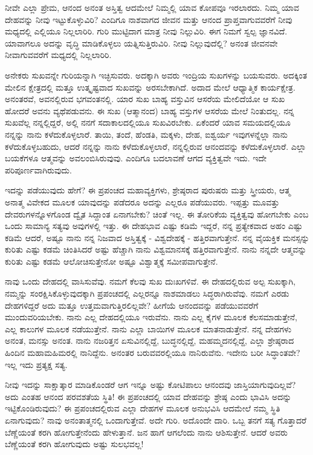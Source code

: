 ನೀವೇ ಎಲ್ಲಾ ಪ್ರೇಮ, ಆನಂದ ಅನಂತ ಅಸ್ತಿತ್ವ ಆದಮೇಲೆ ನಿಮ್ಮಲ್ಲಿ ಯಾವ ಕೋಪವೂ ಇರಲಾರದು. ನಿಮ್ಮ ಯಾವ ದೇಹವನ್ನು ನೀವು ಇಟ್ಟುಕೊಳ್ಳುವಿರಿ? ಎಂದಿಗೂ ನಾಶವಾಗದ ಜೀವನ ಮತ್ತು ಆನಂದ ಪ್ರಾಪ್ತವಾಗುವವರೆಗೆ ನೀವು ಮಧ್ಯದಲ್ಲಿ ಎಲ್ಲಿಯೂ ನಿಲ್ಲಲಾರಿರಿ. ಗುರಿ ಮುಟ್ಟಿದಾಗ ಮಾತ್ರ ನೀವು ನಿಲ್ಲುವಿರಿ. ಈಗ ನಿಮಗೆ ಸ್ವಲ್ಪ ಜ್ಞಾನವಿದೆ. ಯಾವಾಗಲೂ ಅದನ್ನು ವೃದ್ಧಿ ಮಾಡಿಕೊಳ್ಳಲು ಯತ್ನಿಸುತ್ತಿರುವಿರಿ. ನೀವು ನಿಲ್ಲುವುದೆಲ್ಲಿ? ಅನಂತ ಜೀವನವೇ ನೀವಾಗುವವರೆಗೆ ಮಧ್ಯದಲ್ಲಿ ನಿಲ್ಲಲಾರಿರಿ.

ಅನೇಕರು ಸುಖವನ್ನೇ ಗುರಿಯನ್ನಾಗಿ ಇಚ್ಛಿಸುವರು. ಅದಕ್ಕಾಗಿ ಅವರು ಇಂದ್ರಿಯ ಸುಖಗಳನ್ನು ಬಯಸುವರು. ಅದಕ್ಕಿಂತ ಮೇಲಿನ ಕ್ಷೇತ್ರದಲ್ಲಿ ಮತ್ತೂ ಉತ್ಕೃಷ್ಟವಾದ ಸುಖವನ್ನು ಅರಸಬೇಕಾಗಿದೆ. ಅದಾದ ಮೇಲೆ ಆಧ್ಯಾತ್ಮಿಕ ಕಾರ್ಯಕ್ಷೇತ್ರ. ಅನಂತರವೆ, ಅವನಲ್ಲಿರುವ ಭಗವಂತನಲ್ಲಿ. ಯಾರ ಸುಖ ಬಾಹ್ಯ ವಸ್ತುವಿನ ಆಸರೆಯ ಮೇಲಿದೆಯೋ ಆ ಸುಖ ಹೋದರೆ ಅವನು ವ್ಯಥೆಪಡುವನು. ಈ ಸುಖ (ಆತ್ಮಾನಂದ) ಬಾಹ್ಯ ವಸ್ತುಗಳ ಆಸರೆಯ ಮೇಲೆ ನಿಂತುದಲ್ಲ. ನನ್ನ ಸುಖವೆಲ್ಲ ನನ್ನಲ್ಲಿದ್ದರೆ, ಅಲ್ಲಿ ನನಗೆ ಸದಾಕಾಲದಲ್ಲಿಯೂ ಸುಖವಿರಬೇಕು. ಏಕೆಂದರೆ ಯಾವ ಸಮಯದಲ್ಲಿಯೂ ನನ್ನನ್ನು ನಾನು ಕಳೆದುಕೊಳ್ಳಲಾರೆ. ತಾಯಿ, ತಂದೆ, ಹೆಂಡತಿ, ಮಕ್ಕಳು, ದೇಹ, ಐಶ್ವರ್ಯ ಇವುಗಳನ್ನೆಲ್ಲಾ ನಾನು ಕಳೆದುಕೊಳ್ಳಬಹುದು, ಆದರೆ ನನ್ನನ್ನು ನಾನು ಕಳೆದುಕೊಳ್ಳಲಾರೆ, ನನ್ನಲ್ಲಿರುವ ಆನಂದವನ್ನು ಕಳೆದುಕೊಳ್ಳಲಾರೆ. ಎಲ್ಲಾ ಬಯಕೆಗಳೂ ಆತ್ಮವನ್ನು ಅವಲಂಬಿಸಿರುವುವು. ಎಂದಿಗೂ ಬದಲಾವಣೆ ಆಗದ ವ್ಯಕ್ತಿತ್ವವೇ ಇದು. ಇದೇ ಪರಿಪೂರ್ಣವಾಗಿರುವುದು.

ಇದನ್ನು ಪಡೆಯುವುದು ಹೇಗೆ? ಈ ಪ್ರಪಂಚದ ಮಹಾವ್ಯಕ್ತಿಗಳು, ಶ್ರೇಷ್ಠರಾದ ಪುರುಷರು ಮತ್ತು ಸ್ತ್ರೀಯರು, ಆತ್ಮ ಅನಾತ್ಮ ವಿವೇಕದ ಮೂಲಕ ಯಾವುದನ್ನು ಪಡೆದರೂ ಅದನ್ನು ಎಲ್ಲರೂ ಪಡೆಯುವರು. ಇಪ್ಪತ್ತು ಮೂವತ್ತು ದೇವರುಗಳನ್ನೊಳಗೊಂಡ ದ್ವೈತ ಸಿದ್ದಾಂತ ಏನಾಗಬೇಕು? ಚಿಂತೆ ಇಲ್ಲ. ಈ ತೋರಿಕೆಯ ವ್ಯಕ್ತಿತ್ವವು ಹೋಗಬೇಕು ಎಂಬ ಒಂದು ಸಾಮಾನ್ಯ ಸತ್ಯವು ಅವುಗಳಲ್ಲಿ ಇತ್ತು. ಈ ದೇಹಭಾವ ಎಷ್ಟು ಕಡಿಮೆ ಇದ್ದರೆ, ನನ್ನ ಪ್ರತ್ಯೇಕವಾದ ಅಹಂ ಎಷ್ಟು ಕಡಿಮೆ ಆದರೆ, ಅಷ್ಟೂ ನಾನು ನನ್ನ ನಿಜವಾದ ಅಸ್ತಿತ್ವಕ್ಕೆ - ವಿಶ್ವದೇಹಕ್ಕೆ - ಹತ್ತಿರವಾಗುತ್ತೇನೆ. ನನ್ನ ವೈಯಕ್ತಿಕ ಮನಸ್ಸನ್ನು ಕುರಿತು ಎಷ್ಟು ಕಡಮೆ ಚಿಂತಿಸಿದರೆ ಅಷ್ಟು ಹೆಚ್ಚಾಗಿ ನಾನು ವಿಶ್ವಮಾನಸಕ್ಕೆ ಹತ್ತಿರವಾಗುತ್ತೇನೆ. ನಾನು ನನ್ನದೇ ಆತ್ಮವನ್ನು ಕುರಿತು ಎಷ್ಟು ಕಡಮೆ ಆಲೋಚಿಸುತ್ತೇನೋ ಅಷ್ಟೂ ವಿಶ್ವಾತ್ಮಕ್ಕೆ ಸಮೀಪವಾಗುತ್ತೇನೆ.

ನಾವು ಒಂದು ದೇಹದಲ್ಲಿ ವಾಸಿಸುವೆವು. ನಮಗೆ ಕೆಲವು ಸುಖ ದುಃಖಗಳಿವೆ. ಈ ದೇಹದಲ್ಲಿರುವ ಅಲ್ಪ ಸುಖಕ್ಕಾಗಿ, ನಮ್ಮನ್ನು ಸಂರಕ್ಷಿಸಿಕೊಳ್ಳುವುದಕ್ಕಾಗಿ ಪ್ರಪಂಚದಲ್ಲಿ ಎಲ್ಲರನ್ನೂ ನಾಶಮಾಡಲು ಸಿದ್ಧರಾಗಿರುವೆವು. ನಮಗೆ ಎರಡು ದೇಹಗಳಿದ್ದರೆ ಅದು ಮತ್ತೂ ಉತ್ತಮವಾಗುತ್ತಿರಲಿಲ್ಲವೇ? ಹೀಗೆಯೆ ಆನಂದವನ್ನು ಪಡೆಯುವವರೆಗೆ ಮುಂದುವರಿಯಬೇಕು. ನಾನು ಎಲ್ಲ ದೇಹದಲ್ಲಿಯೂ ಇರುವೆನು. ನಾನು ಎಲ್ಲ ಕೈಗಳ ಮೂಲಕ ಕೆಲಸಮಾಡುತ್ತೇನೆ, ಎಲ್ಲ ಕಾಲುಗಳ ಮೂಲಕ ನಡೆಯುತ್ತೇನೆ. ನಾನು ಎಲ್ಲಾ ಬಾಯಿಗಳ ಮೂಲಕ ಮಾತನಾಡುತ್ತೇನೆ. ನನ್ನ ದೇಹಗಳು ಅನಂತ, ಮನಸ್ಸು ಅನಂತ. ನಾನು ನಜರಿತ್ತನ ಏಸುವಿನಲ್ಲಿದ್ದೆ, ಬುದ್ಧನಲ್ಲಿದ್ದೆ, ಮಹಮ್ಮದನಲ್ಲಿದ್ದೆ, ಎಲ್ಲಾ ಶ್ರೇಷ್ಠರಾದ ಹಿಂದಿನ ಮಹಾಮಹಿಮರಲ್ಲಿ ನಾನಿದ್ದೆನು. ಅನಂತರ ಬರುವವರಲ್ಲಿಯೂ ನಾನಿರುವೆನು. ಇದೇನು ಬರೀ ಸಿದ್ಧಾಂತವೇ? ಇಲ್ಲ ಇದು ಪ್ರತ್ಯಕ್ಷ ಸತ್ಯ.

ನೀವು ಇದನ್ನು ಸಾಕ್ಷಾತ್ಕಾರ ಮಾಡಿಕೊಂಡರೆ ಆಗ ಇನ್ನೂ ಅಷ್ಟು ಕೋಟಿಪಾಲು ಆನಂದವು ಜಾಸ್ತಿಯಾಗುವುದಿಲ್ಲವೆ? ಅದು ಎಂತಹ ಆನಂದ ಪರವಶತೆಯ ಸ್ಥಿತಿ! ಈ ಪ್ರಪಂಚದಲ್ಲಿ ಯಾವ ದೇಹವನ್ನು ಶ್ರೇಷ್ಠ ಎಂದು ಭಾವಿಸಿ ಅದನ್ನು ಇಟ್ಟಿಕೊಂಡಿರುವುದು? ಈ ಪ್ರಪಂಚದಲ್ಲಿರುವ ಎಲ್ಲಾ ದೇಹಗಳ ಮೂಲಕ ಅನುಭವಿಸಿ ಆದಮೇಲೆ ನಮ್ಮ ಸ್ಥಿತಿ ಏನಾಗುವುದು? ನಾವು ಅನಂತಾತ್ಮನಲ್ಲಿ ಒಂದಾಗುತ್ತೇವೆ. ಅದೇ ಗುರಿ. ಅದೊಂದೇ ದಾರಿ. ಒಬ್ಬ ತನಗೆ ಸತ್ಯ ಗೊತ್ತಾದರೆ ಬೆಣ್ಣೆಯಂತೆ ಕರಗಿ ಹೋಗುತ್ತೇನೆಂದು ಹೇಳುತ್ತಾನೆ. ಜನ ಹಾಗೆ ಆಗಲೆಂದು ನಾನು ಆಶಿಸುತ್ತೇನೆ. ಆದರೆ ಅವರು ಬೆಣ್ಣೆಯಂತೆ ಕರಗಿ ಹೋಗುವುದು ಅಷ್ಟು ಸುಲಭವಲ್ಲ!

